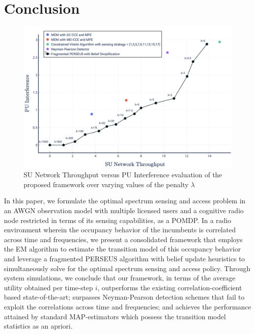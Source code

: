 \documentclass[10pt,twocolumn]{IEEEtran}
\begin{document}
\section{Conclusion}\label{V}
\begin{figure}
    \centering
    \includegraphics[width=1.0\linewidth]{SU_Throughput_PU_Interference_Varying_Penalty.png}
    \caption{SU Network Throughput versus PU Interference evaluation of the proposed framework over varying values of the penalty $\lambda$}
    \vspace{-5mm}
    \label{fig:8}
\end{figure}

In this paper, we formulate the optimal spectrum sensing and access problem in an AWGN observation model with multiple licensed users and a cognitive radio node restricted in terms of its sensing capabilities, as a POMDP. In a radio environment wherein the occupancy behavior of the incumbents is correlated across time and frequencies, we present a consolidated framework that employs the EM algorithm to estimate the transition model of this occupancy behavior and leverage a fragmented PERSEUS algorithm with belief update heuristics to simultaneously solve for the optimal spectrum sensing and access policy. Through system simulations, we conclude that our framework, in terms of the average utility obtained per time-step $i$, outperforms the existing correlation-coefficient based state-of-the-art; surpasses Neyman-Pearson detection schemes that fail to exploit the correlations across time and frequencies; and achieves the performance attained by standard MAP-estimators which possess the transition model statistics as an apriori.
\vspace{-2.5mm}


\end{document}
